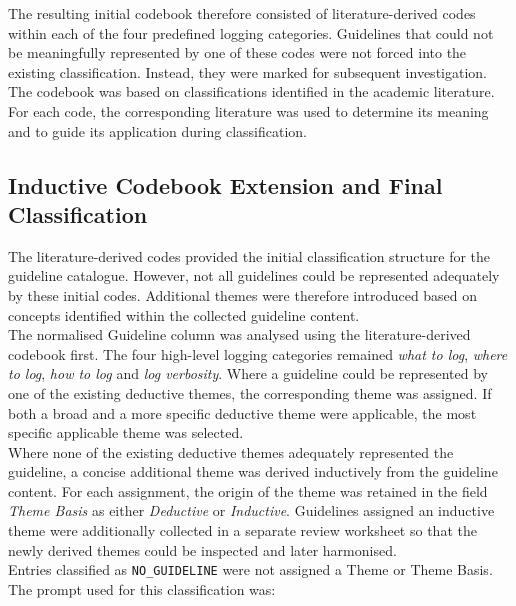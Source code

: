 The resulting initial codebook therefore consisted of literature-derived codes within
each of the four predefined logging categories. Guidelines that could not be
meaningfully represented by one of these codes were not forced into the existing
classification. Instead, they were marked for subsequent investigation.
\\
The codebook was based on classifications identified in the academic literature.
For each code, the corresponding literature was used to determine its meaning and
to guide its application during classification.

\subsection{Inductive Codebook Extension and Final Classification}

The literature-derived codes provided the initial classification structure for the
guideline catalogue. However, not all guidelines could be represented adequately by
these initial codes. Additional themes were therefore introduced based on concepts
identified within the collected guideline content.
\\
The normalised Guideline column was analysed using the literature-derived codebook
first. The four high-level logging categories remained \textit{what to log},
\textit{where to log}, \textit{how to log} and \textit{log verbosity}. Where a
guideline could be represented by one of the existing deductive themes, the
corresponding theme was assigned. If both a broad and a more specific deductive theme
were applicable, the most specific applicable theme was selected.
\\
Where none of the existing deductive themes adequately represented the guideline, a
concise additional theme was derived inductively from the guideline content. For each
assignment, the origin of the theme was retained in the field \textit{Theme Basis} as
either \textit{Deductive} or \textit{Inductive}. Guidelines assigned an inductive theme
were additionally collected in a separate review worksheet so that the newly derived
themes could be inspected and later harmonised.
\\
Entries classified as \texttt{NO\_GUIDELINE} were not assigned a Theme or Theme Basis.
\\
The prompt used for this classification was:

